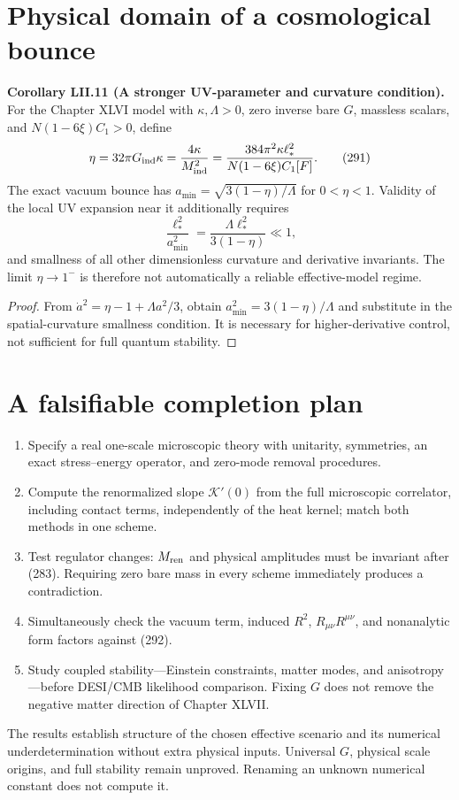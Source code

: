 \documentclass[11pt,a4paper,oneside]{book}
\newcommand{\statement}[3]{\par\medskip\noindent\textbf{#1 #2 (#3).}\ }
\begin{document}
\section{Physical domain of a cosmological bounce}
\statement{Corollary}{LII.11}{A stronger UV-parameter and curvature condition}
For the Chapter XLVI model with $\kappa,\Lambda>0$, zero inverse bare $G$, massless scalars, and $N(1-6\xi)C_1>0$, define
\begin{equation}\eta=32\pi G_{\rm ind}\kappa=\frac{4\kappa}{M_{\rm ind}^2}=\frac{384\pi^2\kappa\ell_*^2}{N(1-6\xi)C_1[F]}.\tag{291}\end{equation}
The exact vacuum bounce has $a_{\min}=\sqrt{3(1-\eta)/\Lambda}$ for $0<\eta<1$. Validity of the local UV expansion near it additionally requires
\begin{equation}\frac{\ell_*^2}{a_{\min}^2}=\frac{\Lambda\ell_*^2}{3(1-\eta)}\ll1,\tag{292}\end{equation}
and smallness of all other dimensionless curvature and derivative invariants. The limit $\eta\to1^-$ is therefore not automatically a reliable effective-model regime.
\begin{proof}
From $\dot a^2=\eta-1+\Lambda a^2/3$, obtain $a_{\min}^2=3(1-\eta)/\Lambda$ and substitute in the spatial-curvature smallness condition. It is necessary for higher-derivative control, not sufficient for full quantum stability.
\end{proof}
\section{A falsifiable completion plan}
\begin{enumerate}
\item Specify a real one-scale microscopic theory with unitarity, symmetries, an exact stress--energy operator, and zero-mode removal procedures.
\item Compute the renormalized slope $\mathcal K'(0)$ from the full microscopic correlator, including contact terms, independently of the heat kernel; match both methods in one scheme.
\item Test regulator changes: $M_{\rm ren}$ and physical amplitudes must be invariant after (283). Requiring zero bare mass in every scheme immediately produces a contradiction.
\item Simultaneously check the vacuum term, induced $R^2$, $R_{\mu\nu}R^{\mu\nu}$, and nonanalytic form factors against (292).
\item Study coupled stability---Einstein constraints, matter modes, and anisotropy---before DESI/CMB likelihood comparison. Fixing $G$ does not remove the negative matter direction of Chapter XLVII.
\end{enumerate}
The results establish structure of the chosen effective scenario and its numerical underdetermination without extra physical inputs. Universal $G$, physical scale origins, and full stability remain unproved. Renaming an unknown numerical constant does not compute it.
\setcounter{equation}{292}
\end{document}

